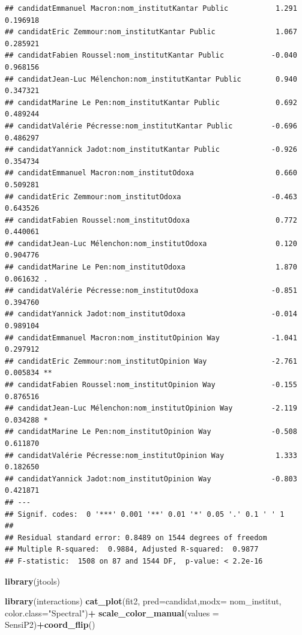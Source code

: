 \documentclass[
]{book}
\newenvironment{Shaded}{\begin{snugshade}}{\end{snugshade}}
\newcommand{\DataTypeTok}[1]{\textcolor[rgb]{0.13,0.29,0.53}{#1}}
\newcommand{\KeywordTok}[1]{\textcolor[rgb]{0.13,0.29,0.53}{\textbf{#1}}}
\newcommand{\NormalTok}[1]{#1}
\newcommand{\OperatorTok}[1]{\textcolor[rgb]{0.81,0.36,0.00}{\textbf{#1}}}
\newcommand{\StringTok}[1]{\textcolor[rgb]{0.31,0.60,0.02}{#1}}
\begin{document}
\begin{verbatim}
## candidatEmmanuel Macron:nom_institutKantar Public           1.291 0.196918    
## candidatEric Zemmour:nom_institutKantar Public              1.067 0.285921    
## candidatFabien Roussel:nom_institutKantar Public           -0.040 0.968156    
## candidatJean-Luc Mélenchon:nom_institutKantar Public        0.940 0.347321    
## candidatMarine Le Pen:nom_institutKantar Public             0.692 0.489244    
## candidatValérie Pécresse:nom_institutKantar Public         -0.696 0.486297    
## candidatYannick Jadot:nom_institutKantar Public            -0.926 0.354734    
## candidatEmmanuel Macron:nom_institutOdoxa                   0.660 0.509281    
## candidatEric Zemmour:nom_institutOdoxa                     -0.463 0.643526    
## candidatFabien Roussel:nom_institutOdoxa                    0.772 0.440061    
## candidatJean-Luc Mélenchon:nom_institutOdoxa                0.120 0.904776    
## candidatMarine Le Pen:nom_institutOdoxa                     1.870 0.061632 .  
## candidatValérie Pécresse:nom_institutOdoxa                 -0.851 0.394760    
## candidatYannick Jadot:nom_institutOdoxa                    -0.014 0.989104    
## candidatEmmanuel Macron:nom_institutOpinion Way            -1.041 0.297912    
## candidatEric Zemmour:nom_institutOpinion Way               -2.761 0.005834 ** 
## candidatFabien Roussel:nom_institutOpinion Way             -0.155 0.876516    
## candidatJean-Luc Mélenchon:nom_institutOpinion Way         -2.119 0.034288 *  
## candidatMarine Le Pen:nom_institutOpinion Way              -0.508 0.611870    
## candidatValérie Pécresse:nom_institutOpinion Way            1.333 0.182650    
## candidatYannick Jadot:nom_institutOpinion Way              -0.803 0.421871    
## ---
## Signif. codes:  0 '***' 0.001 '**' 0.01 '*' 0.05 '.' 0.1 ' ' 1
## 
## Residual standard error: 0.8489 on 1544 degrees of freedom
## Multiple R-squared:  0.9884, Adjusted R-squared:  0.9877 
## F-statistic:  1508 on 87 and 1544 DF,  p-value: < 2.2e-16
\end{verbatim}

\begin{Shaded}
\begin{Highlighting}[]
\KeywordTok{library}\NormalTok{(jtools)}

\KeywordTok{library}\NormalTok{(interactions)}
\KeywordTok{cat_plot}\NormalTok{(fit2, }\DataTypeTok{pred=}\NormalTok{candidat,}\DataTypeTok{modx=}\NormalTok{ nom_institut, }\DataTypeTok{color.class=}\StringTok{"Spectral"}\NormalTok{)}\OperatorTok{+}
\StringTok{  }\KeywordTok{scale_color_manual}\NormalTok{(}\DataTypeTok{values =}\NormalTok{ SensiP2)}\OperatorTok{+}\KeywordTok{coord_flip}\NormalTok{()}
\end{Highlighting}
\end{Shaded}
\end{document}
